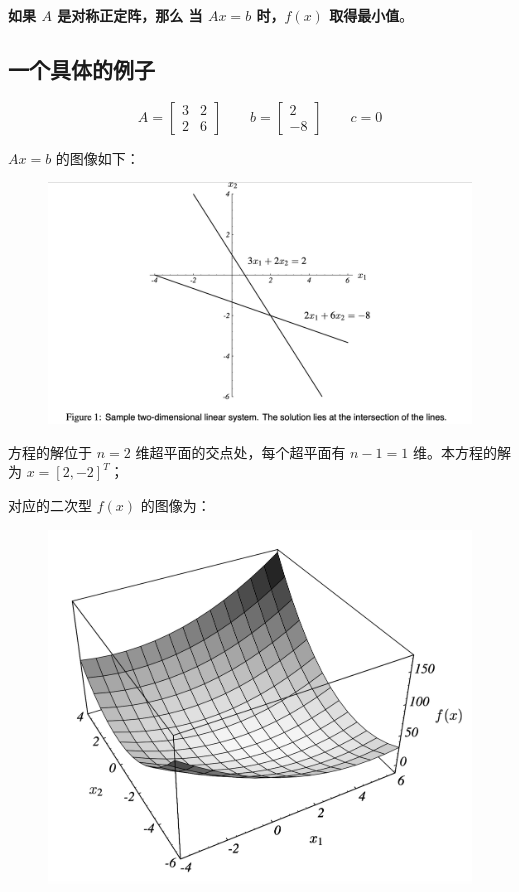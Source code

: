 \documentclass[12pt]{article}
\begin{document}
\textbf{如果 $A$ 是对称正定阵，那么 当 $Ax = b$ 时，$f(x)$ 取得最小值}。

\subsection{一个具体的例子}
$$
A = \begin{bmatrix} 3 & 2 \\ 2 & 6 \end{bmatrix} \qquad 
b = \begin{bmatrix} 2 \\ -8 \end{bmatrix} \qquad 
c = 0
$$

$Ax = b$ 的图像如下：
\begin{figure}[H]
    \centering
    \includegraphics[width=.8\textwidth]{fig/CG_Plot_Eq_1.png}
\end{figure}
方程的解位于 $n=2$ 维超平面的交点处，每个超平面有 $n-1=1$ 维。本方程的解为 $x = [2, -2]^T$；

对应的二次型 $f(x)$ 的图像为：
\begin{figure}[H]
    \centering
    \includegraphics[width=.6\textwidth]{fig/CG_Plot_Eq_2.png}
\end{figure}
\end{document}

